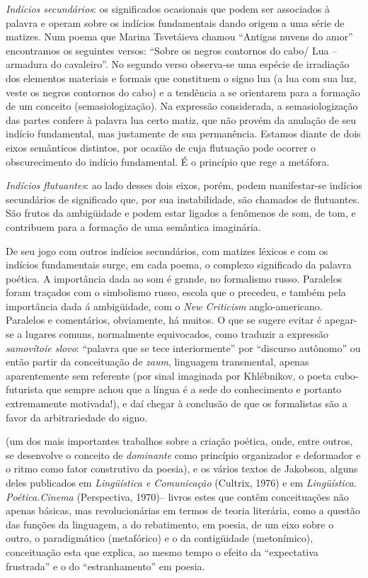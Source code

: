 {  \emph{Indícios secundários}: os significados ocasionais que podem ser
  associados à palavra e operam sobre os indícios fundamentais dando
  origem a uma série de matizes. Num poema que Marina Tsvetáieva chamou
  ``Antigas nuvens do amor'' encontramos os seguintes versos: ``Sobre os
  negros contornos do cabo/ Lua -- armadura do cavaleiro''. No segundo
  verso observa-se uma espécie de irradiação dos elementos materiais e
  formais que constituem o signo lua (a lua com sua luz, veste os negros
  contornos do cabo) e a tendência a se orientarem para a formação de um
  conceito (semasiologização). Na expressão considerada, a
  semasiologização das partes confere à palavra lua certo matiz, que não
  provém da anulação de seu indício fundamental, mas justamente de sua
  permanência. Estamos diante de dois eixos semânticos distintos, por
  ocasião de cuja flutuação pode ocorrer o obscurecimento do indício
  fundamental. É o princípio que rege a metáfora.

  \emph{Indícios flutuantes}: ao lado desses dois eixos, porém, podem
  manifestar-se indícios secundários de significado que, por sua
  instabilidade, são chamados de flutuantes. São frutos da ambigüidade e
  podem estar ligados a fenômenos de som, de tom, e contribuem para a
  formação de uma semântica imaginária.

  De seu jogo com outros indícios secundários, com matizes léxicos e com
  os indícios fundamentais surge, em cada poema, o complexo significado
  da palavra poética. A importância dada ao som é grande, no formalismo
  russo. Paralelos foram traçados com o simbolismo russo, escola que o
  precedeu, e também pela importância dada á ambigüidade, com o
  \emph{New Criticism} anglo-americano. Paralelos e comentários,
  obviamente, há muitos. O que se sugere evitar é apegar-se a lugares
  comuns, normalmente equivocados, como traduzir a expressão
  \emph{samovítoie slovo}: ``palavra que se tece interiormente'' por
  ``discurso autônomo'' ou então partir da conceituação de \emph{zaum},
  linguagem transmental, apenas aparentemente sem referente (por sinal
  imaginada por Khlébnikov, o poeta cubo-futurista que sempre achou que
  a língua é a sede do conhecimento e portanto extremamente motivada!),
  e daí chegar à conclusão de que os formalistas são a favor da
  arbitrariedade do signo.} (um dos mais importantes trabalhos sobre a
criação poética, onde, entre outros, se desenvolve o conceito de
\emph{dominante} como princípio organizador e deformador e o ritmo como
fator construtivo da poesia), e os vários textos de Jakobson, alguns
deles publicados em \emph{Lingüística e Comunicação} (Cultrix, 1976) e
em \emph{Lingüística. Poética.Cinema} (Perspectiva, 1970)-- livros estes
que contêm conceituações não apenas básicas, mas revolucionárias em
termos de teoria literária, como a questão das funções da linguagem, a
do rebatimento, em poesia, de um eixo sobre o outro, o paradigmático
(metafórico) e o da contigüidade (metonímico), conceituação esta que
explica, ao mesmo tempo o efeito da ``expectativa frustrada'' e o do
``estranhamento'' em poesia.

